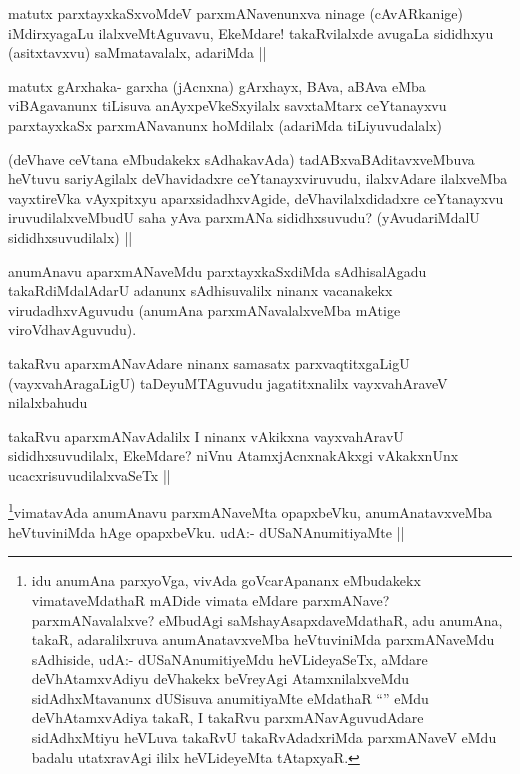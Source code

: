 \begin{artha}
matutx parxtayxkaSxvoMdeV parxmANavenunxva ninage (cAvARkanige) iMdirxyagaLu ilalxveMtAguvavu, EkeMdare! takaRvilalxde avugaLa sididhxyu (asitxtavxvu) saMmatavalalx, adariMda ||
\end{artha}

\begin{artha}
matutx gArxhaka- garxha (jAcnxna) gArxhayx, BAva, aBAva eMba viBAgavanunx tiLisuva anAyxpeVkeSxyilalx savxtaMtarx ceYtanayxvu parxtayxkaSx parxmANavanunx hoMdilalx (adariMda tiLiyuvudalalx) 
\end{artha}

\begin{artha}
(deVhave ceVtana eMbudakekx sAdhakavAda) tadABxvaBAditavxveMbuva heVtuvu sariyAgilalx deVhavidadxre ceYtanayxviruvudu, ilalxvAdare ilalxveMba vayxtireVka vAyxpitxyu aparxsidadhxvAgide, deVhavilalxdidadxre ceYtanayxvu iruvudilalxveMbudU saha yAva parxmANa sididhxsuvudu? (yAvudariMdalU sididhxsuvudilalx) ||
\end{artha}

\begin{artha}
anumAnavu aparxmANaveMdu parxtayxkaSxdiMda sAdhisalAgadu takaRdiMdalAdarU adanunx sAdhisuvalilx ninanx vacanakekx virudadhxvAguvudu (anumAna parxmANavalalxveMba mAtige viroVdhavAguvudu).
\end{artha}

\begin{artha}
takaRvu aparxmANavAdare ninanx samasatx parxvaqtitxgaLigU (vayxvahAragaLigU) taDeyuMTAguvudu jagatitxnalilx vayxvahAraveV nilalxbahudu
\end{artha}

\begin{artha}
takaRvu aparxmANavAdalilx I ninanx vAkikxna vayxvahAravU sididhxsuvudilalx, EkeMdare? niVnu AtamxjAcnxnakAkxgi vAkakxnUnx ucacxrisuvudilalxvaSeTx ||
\end{artha}

\begin{artha}
\footnote{idu anumAna parxyoVga, vivAda goVcarApananx eMbudakekx vimataveMdathaR mADide vimata eMdare parxmANave? parxmANavalalxve? eMbudAgi saMshayAsapxdaveMdathaR, adu anumAna, takaR, adaralilxruva anumAnatavxveMba heVtuviniMda parxmANaveMdu sAdhiside, udA:- dUSaNAnumitiyeMdu heVLideyaSeTx, aMdare deVhAtamxvAdiyu deVhakekx beVreyAgi AtamxnilalxveMdu sidAdhxMtavanunx dUSisuva anumitiyaMte eMdathaR ``\stext'' eMdu deVhAtamxvAdiya takaR, I takaRvu parxmANavAguvudAdare sidAdhxMtiyu heVLuva takaRvU takaRvAdadxriMda parxmANaveV eMdu badalu utatxravAgi ililx heVLideyeMta tAtapxyaR.}vimatavAda anumAnavu parxmANaveMta opapxbeVku, anumAnatavxveMba heVtuviniMda hAge opapxbeVku. udA:- dUSaNAnumitiyaMte ||
\end{artha}


